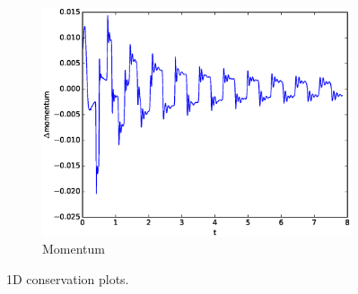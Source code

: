 \begin{figure}[htp]
\begin{subfigure}[b]{0.32\textwidth}
        \centering
        \includegraphics[width=\textwidth]{images/Mo1d.eps}\hfill
        \caption{Momentum}
        \label{Momentum}
    \end{subfigure}
    \caption{1D conservation plots.}
    \label{fig:three graphs}
\end{figure}
